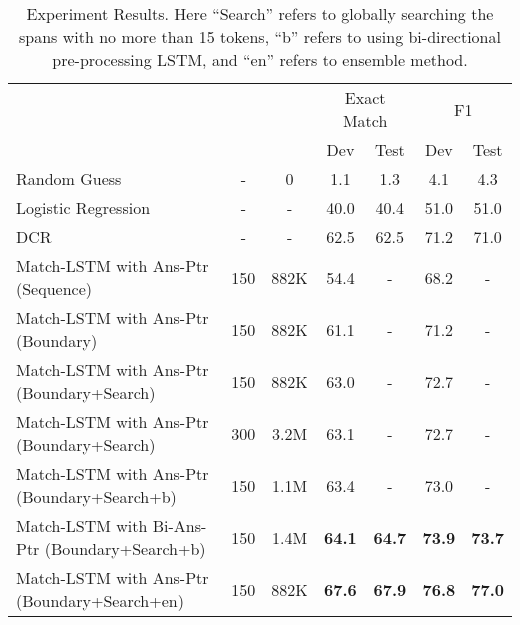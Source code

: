 \documentclass{article} \usepackage{iclr2017_conference,times}
\begin{document}
\begin{table}[]
\centering
	 \small
	
\begin{tabular}{lcccccc}
		\toprule
		\multicolumn{1}{c}{}      & \multicolumn{1}{c}{} & \multicolumn{1}{c}{} & \multicolumn{2}{c}{Exact Match}   & \multicolumn{2}{c}{F1}            \\ 
		&                       &                         & Dev             & Test            & Dev             & Test            \\ \midrule
		Random Guess              & -                     & 0                       & 1.1          & 1.3           & 4.1           & 4.3           \\
		Logistic Regression       & -                     & -                       & 40.0          & 40.4          & 51.0          & 51.0          \\
		DCR       & -                     & -                       &  62.5           & 62.5           & 71.2           & 71.0          \\ \midrule 
		Match-LSTM with Ans-Ptr (Sequence) & 150                   & 882K                    & 54.4 & - & 68.2 & - \\
		Match-LSTM with Ans-Ptr (Boundary) & 150                   & 882K                    & 61.1 & - & 71.2 & - \\
		Match-LSTM with Ans-Ptr (Boundary+Search) & 150                   & 882K                    & 63.0 & - & 72.7 & - \\
		Match-LSTM with Ans-Ptr (Boundary+Search) & 300                   & 3.2M                    & 63.1 & - & 72.7 & - \\
		Match-LSTM with Ans-Ptr (Boundary+Search+b) & 150                   & 1.1M                    & 63.4 & - & 73.0 & - \\
		Match-LSTM with Bi-Ans-Ptr (Boundary+Search+b) & 150                   & 1.4M                    & \textbf{64.1} & \textbf{64.7} & \textbf{73.9} & \textbf{73.7} \\ \midrule
		Match-LSTM with Ans-Ptr (Boundary+Search+en) & 150                   & 882K                    & \textbf{67.6} & \textbf{67.9} & \textbf{76.8} & \textbf{77.0} \\
		 \bottomrule
\end{tabular}
\normalsize
\caption{Experiment Results. Here ``Search'' refers to globally searching the spans with no more than 15 tokens, ``b'' refers to using bi-directional pre-processing LSTM, and ``en'' refers to ensemble method.}
\label{tab:results}
\end{table}
\end{document}

